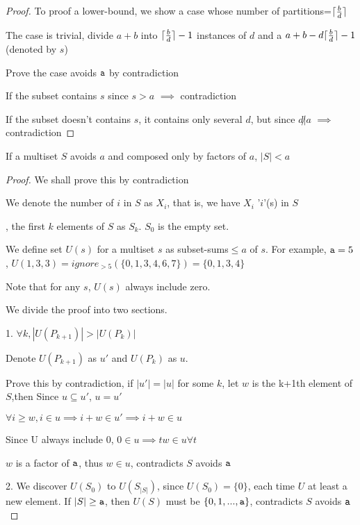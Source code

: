 \begin{proof}
To proof a lower-bound, we show a case whose number of partitions=$\lceil\frac{b}{d}\rceil$

The case is trivial, divide $a+b$ into $\lceil\frac{b}{d}\rceil-1$ instances of $d$ and a $a+b-d\lceil\frac{b}{d}\rceil-1$ (denoted by $s$)

Prove the case avoids $\mathtt{a}$ by contradiction

If the subset contains $s$ since $s>a$ $\implies$ contradiction

If the subset doesn't contains $s$, it contains only several $d$, but since $d\not| a$ $\implies$ contradiction
\end{proof}

\begin{lemma}
If a multiset $S$ avoids $a$ and composed only by factors of $a$, $|S|<a$
\end{lemma}

\begin{proof}

We shall prove this by contradiction

We denote the number of $i$ in $S$ as $X_i$, that is, we have $X_i$ '$i$'(s) in $S$

, the first $k$ elements of $S$ as $S_k$. $S_0$ is the empty set.

We define set $U(s)$ for a multiset $s$ as subset-sums$\leq a$ of $s$. For example, $\mathtt{a}=5$, $U({1,3,3})=ignore_{>5}(\{ 0,1,3,4,6,7\})=\{ 0,1,3,4\}$

Note that for any $s$, $U(s)$ always include zero.

We divide the proof into two sections.

1. $\forall k, |U(P_{k+1})|>|U(P_k)| $ 

Denote $U(P_{k+1})$ as $u'$ and $U(P_k)$ as $u$.

Prove this by contradiction, if $|u'|=|u|$ for some $k$, let $w$ is the k+1th element of $S$,then 
Since $u\subseteq u'$, $u=u'$

$\forall i\geq w, i \in u \implies i+w\in u' \implies i+w\in u$

Since U always include 0, $0\in u \implies tw\in u \forall t$

$w$ is a factor of $\mathtt{a}$, thus $w\in u$, contradicts $S$ avoids $\mathtt{a}$

2. We discover $U(S_0)$ to $U(S_{|S|})$, since $U(S_0)=\{0\}$, each time
$U$ at least a new element. If $|S|\geq \mathtt{a}$, then $U(S)$
must be $\{0,1,...,\mathtt{a}\}$, contradicts $S$ avoids $\mathtt{a}$


\end{proof}

